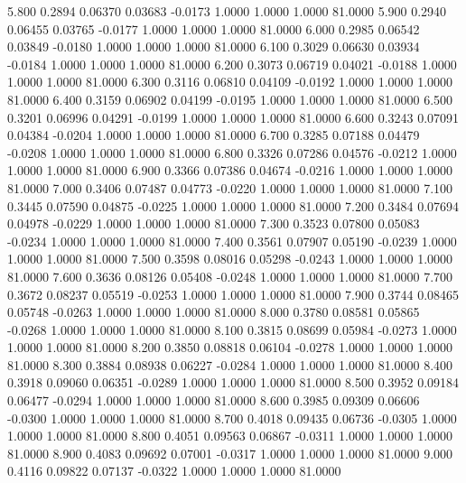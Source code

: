    5.800   0.2894   0.06370   0.03683  -0.0173   1.0000   1.0000   1.0000  81.0000
   5.900   0.2940   0.06455   0.03765  -0.0177   1.0000   1.0000   1.0000  81.0000
   6.000   0.2985   0.06542   0.03849  -0.0180   1.0000   1.0000   1.0000  81.0000
   6.100   0.3029   0.06630   0.03934  -0.0184   1.0000   1.0000   1.0000  81.0000
   6.200   0.3073   0.06719   0.04021  -0.0188   1.0000   1.0000   1.0000  81.0000
   6.300   0.3116   0.06810   0.04109  -0.0192   1.0000   1.0000   1.0000  81.0000
   6.400   0.3159   0.06902   0.04199  -0.0195   1.0000   1.0000   1.0000  81.0000
   6.500   0.3201   0.06996   0.04291  -0.0199   1.0000   1.0000   1.0000  81.0000
   6.600   0.3243   0.07091   0.04384  -0.0204   1.0000   1.0000   1.0000  81.0000
   6.700   0.3285   0.07188   0.04479  -0.0208   1.0000   1.0000   1.0000  81.0000
   6.800   0.3326   0.07286   0.04576  -0.0212   1.0000   1.0000   1.0000  81.0000
   6.900   0.3366   0.07386   0.04674  -0.0216   1.0000   1.0000   1.0000  81.0000
   7.000   0.3406   0.07487   0.04773  -0.0220   1.0000   1.0000   1.0000  81.0000
   7.100   0.3445   0.07590   0.04875  -0.0225   1.0000   1.0000   1.0000  81.0000
   7.200   0.3484   0.07694   0.04978  -0.0229   1.0000   1.0000   1.0000  81.0000
   7.300   0.3523   0.07800   0.05083  -0.0234   1.0000   1.0000   1.0000  81.0000
   7.400   0.3561   0.07907   0.05190  -0.0239   1.0000   1.0000   1.0000  81.0000
   7.500   0.3598   0.08016   0.05298  -0.0243   1.0000   1.0000   1.0000  81.0000
   7.600   0.3636   0.08126   0.05408  -0.0248   1.0000   1.0000   1.0000  81.0000
   7.700   0.3672   0.08237   0.05519  -0.0253   1.0000   1.0000   1.0000  81.0000
   7.900   0.3744   0.08465   0.05748  -0.0263   1.0000   1.0000   1.0000  81.0000
   8.000   0.3780   0.08581   0.05865  -0.0268   1.0000   1.0000   1.0000  81.0000
   8.100   0.3815   0.08699   0.05984  -0.0273   1.0000   1.0000   1.0000  81.0000
   8.200   0.3850   0.08818   0.06104  -0.0278   1.0000   1.0000   1.0000  81.0000
   8.300   0.3884   0.08938   0.06227  -0.0284   1.0000   1.0000   1.0000  81.0000
   8.400   0.3918   0.09060   0.06351  -0.0289   1.0000   1.0000   1.0000  81.0000
   8.500   0.3952   0.09184   0.06477  -0.0294   1.0000   1.0000   1.0000  81.0000
   8.600   0.3985   0.09309   0.06606  -0.0300   1.0000   1.0000   1.0000  81.0000
   8.700   0.4018   0.09435   0.06736  -0.0305   1.0000   1.0000   1.0000  81.0000
   8.800   0.4051   0.09563   0.06867  -0.0311   1.0000   1.0000   1.0000  81.0000
   8.900   0.4083   0.09692   0.07001  -0.0317   1.0000   1.0000   1.0000  81.0000
   9.000   0.4116   0.09822   0.07137  -0.0322   1.0000   1.0000   1.0000  81.0000
